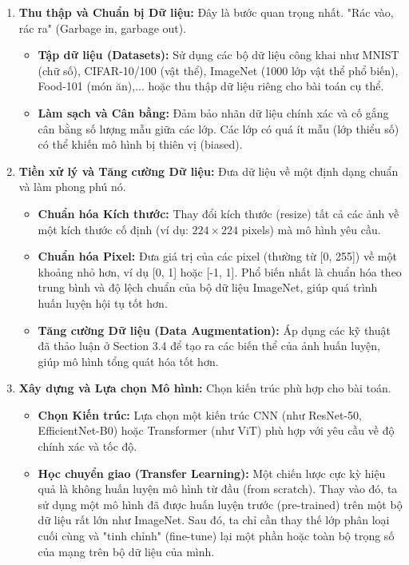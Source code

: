 \begin{enumerate}
    \item \textbf{Thu thập và Chuẩn bị Dữ liệu:}
    Đây là bước quan trọng nhất. "Rác vào, rác ra" (Garbage in, garbage out).
    \begin{itemize}
        \item \textbf{Tập dữ liệu (Datasets):} Sử dụng các bộ dữ liệu công khai như MNIST (chữ số), CIFAR-10/100 (vật thể), ImageNet (1000 lớp vật thể phổ biến), Food-101 (món ăn),... hoặc thu thập dữ liệu riêng cho bài toán cụ thể.
        \item \textbf{Làm sạch và Cân bằng:} Đảm bảo nhãn dữ liệu chính xác và cố gắng cân bằng số lượng mẫu giữa các lớp. Các lớp có quá ít mẫu (lớp thiểu số) có thể khiến mô hình bị thiên vị (biased).
    \end{itemize}

    \item \textbf{Tiền xử lý và Tăng cường Dữ liệu:}
    Đưa dữ liệu về một định dạng chuẩn và làm phong phú nó.
    \begin{itemize}
        \item \textbf{Chuẩn hóa Kích thước:} Thay đổi kích thước (resize) tất cả các ảnh về một kích thước cố định (ví dụ: $224 \times 224$ pixels) mà mô hình yêu cầu.
        \item \textbf{Chuẩn hóa Pixel:} Đưa giá trị của các pixel (thường từ [0, 255]) về một khoảng nhỏ hơn, ví dụ [0, 1] hoặc [-1, 1]. Phổ biến nhất là chuẩn hóa theo trung bình và độ lệch chuẩn của bộ dữ liệu ImageNet, giúp quá trình huấn luyện hội tụ tốt hơn.
        \item \textbf{Tăng cường Dữ liệu (Data Augmentation):} Áp dụng các kỹ thuật đã thảo luận ở Section 3.4 để tạo ra các biến thể của ảnh huấn luyện, giúp mô hình tổng quát hóa tốt hơn.
    \end{itemize}

    \item \textbf{Xây dựng và Lựa chọn Mô hình:}
    Chọn kiến trúc phù hợp cho bài toán.
    \begin{itemize}
        \item \textbf{Chọn Kiến trúc:} Lựa chọn một kiến trúc CNN (như ResNet-50, EfficientNet-B0) hoặc Transformer (như ViT) phù hợp với yêu cầu về độ chính xác và tốc độ.
        \item \textbf{Học chuyển giao (Transfer Learning):} Một chiến lược cực kỳ hiệu quả là không huấn luyện mô hình từ đầu (from scratch). Thay vào đó, ta sử dụng một mô hình đã được huấn luyện trước (pre-trained) trên một bộ dữ liệu rất lớn như ImageNet. Sau đó, ta chỉ cần thay thế lớp phân loại cuối cùng và "tinh chỉnh" (fine-tune) lại một phần hoặc toàn bộ trọng số của mạng trên bộ dữ liệu của mình.
    \end{itemize}


\end{enumerate}
